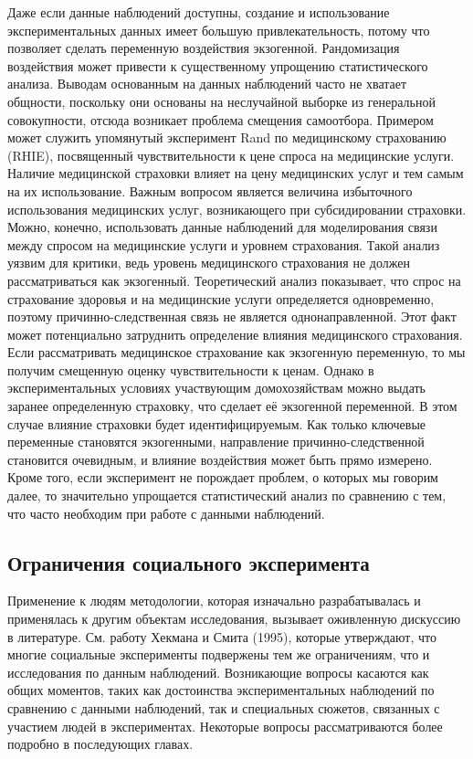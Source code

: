 Даже если данные наблюдений доступны, создание и использование экспериментальных данных имеет большую привлекательность, потому что позволяет сделать переменную воздействия экзогенной.  Рандомизация воздействия может привести к существенному упрощению статистического анализа. Выводам основанным на данных наблюдений часто не хватает общности, поскольку они основаны на неслучайной выборке из генеральной совокупности, отсюда возникает проблема смещения самоотбора. Примером может служить упомянутый эксперимент Rand по медицинскому страхованию (RHIE), посвященный  чувствительности к цене спроса на медицинские услуги. 
Наличие медицинской страховки влияет на цену медицинских услуг и тем самым на их использование. Важным вопросом является величина избыточного использования медицинских услуг, возникающего при субсидировании страховки.  Можно, конечно, использовать данные наблюдений для моделирования связи между спросом на медицинские услуги и уровнем страхования. 
Такой анализ уязвим для критики, ведь уровень медицинского страхования не должен рассматриваться как экзогенный. Теоретический анализ показывает, что спрос на страхование здоровья и на медицинские услуги определяется одновременно, поэтому причинно-следственная связь не является однонаправленной. Этот факт может потенциально  затруднить определение влияния медицинского страхования. 
Если рассматривать медицинское страхование как экзогенную переменную, то мы получим смещенную оценку чувствительности к ценам. Однако в экспериментальных условиях участвующим домохозяйствам можно выдать заранее определенную страховку,  что сделает её экзогенной переменной. В этом случае влияние страховки будет идентифицируемым. Как только ключевые переменные становятся экзогенными, направление причинно-следственной становится очевидным, и влияние воздействия может быть прямо измерено. Кроме того, если эксперимент не порождает проблем, о которых мы говорим далее, то  значительно упрощается статистический анализ по сравнению с тем, что часто необходим при работе с данными наблюдений.



\subsection{Ограничения социального эксперимента}

Применение к людям методологии, которая изначально разрабатывалась и применялась к другим объектам исследования, вызывает оживленную дискуссию в литературе. См. работу Хекмана и Смита (1995), которые утверждают, что многие социальные эксперименты подвержены тем же ограничениям, что и исследования по данным наблюдений. Возникающие вопросы касаются как общих моментов, таких как достоинства экспериментальных наблюдений по сравнению с данными наблюдений, так и специальных сюжетов, связанных с участием людей  в экспериментах. Некоторые вопросы рассматриваются более подробно в последующих главах.

